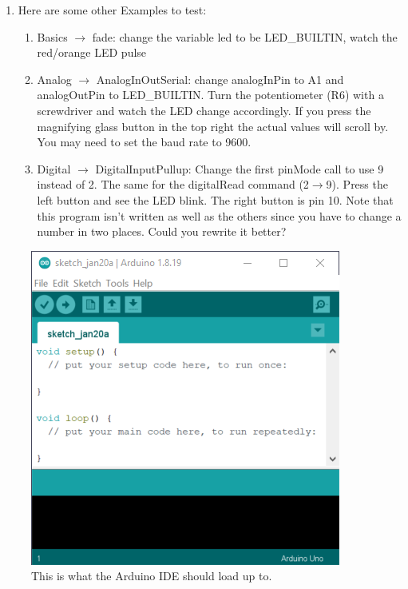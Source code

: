 \begin{enumerate}
	\item Here are some other Examples to test:
	\begin{enumerate}
		\item Basics $\rightarrow$ fade: change the variable led to be LED\_BUILTIN, watch the red/orange LED pulse
		\item Analog $\rightarrow$ AnalogInOutSerial: change analogInPin to A1 and analogOutPin to LED\_BUILTIN. Turn 
				the potentiometer (R6) with a screwdriver and watch the LED change accordingly. If you press the magnifying
				glass button in the top right the actual values will scroll by. You may need to set the baud rate to 9600.
		\item Digital $\rightarrow$ DigitalInputPullup: Change the first pinMode call to use 9 instead of 2. The same for 
				the digitalRead command (2$\rightarrow$9). Press the left button and see the LED blink. The right button is 
				pin 10. Note that this program isn't written as well as the others since you have to change a number in two
				places. Could you rewrite it better?
	\end{enumerate}
\end{enumerate}

\begin{figure}[!htb]
	\centering
	\includegraphics[scale=1.0]{arduinoStart/emptysketch.PNG}
	\caption{This is what the Arduino IDE should load up to.}
	\label{fig:emptysketch}
\end{figure} 

